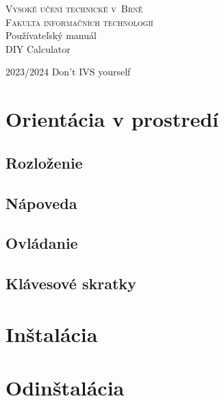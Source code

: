 \documentclass[11pt, a4paper]{article}
\begin{document}
\begin{titlepage}
\begin{center}
\Huge\textsc{Vysoké učení technické v~Brně\\
\huge{Fakulta informačních technologií}}\\
\Huge Používateľský manuál\\[0.5em]
\huge DIY Calculator\\
\end{center}
{\Large {2023/2024 \hfill Don't IVS yourself}}
\end{titlepage}
\newpage 

\tableofcontents

\newpage 
\section{Orientácia v prostredí}
\subsection{Rozloženie}
\subsection{Nápoveda}
\subsection{Ovládanie}
\subsection{Klávesové skratky}

\section{Inštalácia}
\section{Odinštalácia}
\end{document}
